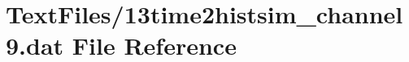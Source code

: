 \hypertarget{13time2histsim__channel9_8dat}{}\section{Text\+Files/13time2histsim\+\_\+channel9.dat File Reference}
\label{13time2histsim__channel9_8dat}
